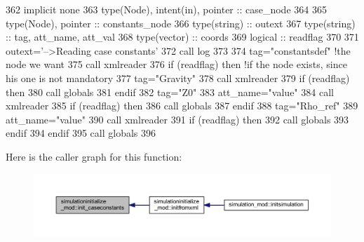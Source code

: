 \begin{DoxyCode}
362     \textcolor{keywordtype}{implicit none}
363     \textcolor{keywordtype}{type}(Node), \textcolor{keywordtype}{intent(in)}, \textcolor{keywordtype}{pointer} :: case\_node
364 
365     \textcolor{keywordtype}{type}(Node), \textcolor{keywordtype}{pointer} :: constants\_node
366     \textcolor{keywordtype}{type}(string) :: outext
367     \textcolor{keywordtype}{type}(string) :: tag, att\_name, att\_val
368     \textcolor{keywordtype}{type}(vector) :: coords
369     \textcolor{keywordtype}{logical} :: readflag
370 
371     outext=\textcolor{stringliteral}{'-->Reading case constants'}
372     \textcolor{keyword}{call }log%
373 
374     tag=\textcolor{stringliteral}{"constantsdef"}    \textcolor{comment}{!the node we want}
375     \textcolor{keyword}{call }xmlreader%
376     \textcolor{keywordflow}{if} (readflag) \textcolor{keywordflow}{then} \textcolor{comment}{!if the node exists, since his one is not mandatory}
377         tag=\textcolor{stringliteral}{"Gravity"}
378         \textcolor{keyword}{call }xmlreader%
379         \textcolor{keywordflow}{if} (readflag) \textcolor{keywordflow}{then}
380             \textcolor{keyword}{call }globals%
381 \textcolor{keywordflow}{        endif}
382         tag=\textcolor{stringliteral}{"Z0"}
383         att\_name=\textcolor{stringliteral}{"value"}
384         \textcolor{keyword}{call }xmlreader%
385         \textcolor{keywordflow}{if} (readflag) \textcolor{keywordflow}{then}
386             \textcolor{keyword}{call }globals%
387 \textcolor{keywordflow}{        endif}
388         tag=\textcolor{stringliteral}{"Rho\_ref"}
389         att\_name=\textcolor{stringliteral}{"value"}
390         \textcolor{keyword}{call }xmlreader%
391         \textcolor{keywordflow}{if} (readflag) \textcolor{keywordflow}{then}
392             \textcolor{keyword}{call }globals%
393 \textcolor{keywordflow}{        endif}
394 \textcolor{keywordflow}{    endif}
395     \textcolor{keyword}{call }globals%
396 
\end{DoxyCode}
Here is the caller graph for this function\+:\nopagebreak
\begin{figure}[H]
\begin{center}
\leavevmode
\includegraphics[width=350pt]{namespacesimulationinitialize__mod_ae41256ca5e72ebf27660ffdfe5c08e46_icgraph}
\end{center}
\end{figure}

